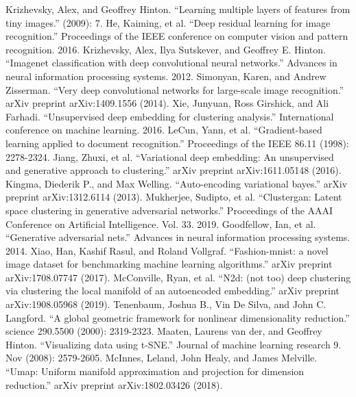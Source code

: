 \documentclass[conference]{IEEEtran}
\begin{document}
\begin{thebibliography}{00}
 Krizhevsky, Alex, and Geoffrey Hinton. ``Learning multiple layers of features from tiny images.'' (2009): 7.
 He, Kaiming, et al. ``Deep residual learning for image recognition.'' Proceedings of the IEEE conference on computer vision and pattern recognition. 2016.
 Krizhevsky, Alex, Ilya Sutskever, and Geoffrey E. Hinton. ``Imagenet classification with deep convolutional neural networks.'' Advances in neural information processing systems. 2012.
 Simonyan, Karen, and Andrew Zisserman. ``Very deep convolutional networks for large-scale image recognition.'' arXiv preprint arXiv:1409.1556 (2014).
 Xie, Junyuan, Ross Girshick, and Ali Farhadi. ``Unsupervised deep embedding for clustering analysis.'' International conference on machine learning. 2016.
 LeCun, Yann, et al. ``Gradient-based learning applied to document recognition.'' Proceedings of the IEEE 86.11 (1998): 2278-2324.
 Jiang, Zhuxi, et al. ``Variational deep embedding: An unsupervised and generative approach to clustering.'' arXiv preprint arXiv:1611.05148 (2016).
 Kingma, Diederik P., and Max Welling. ``Auto-encoding variational bayes.'' arXiv preprint arXiv:1312.6114 (2013).
 Mukherjee, Sudipto, et al. ``Clustergan: Latent space clustering in generative adversarial networks.'' Proceedings of the AAAI Conference on Artificial Intelligence. Vol. 33. 2019.
 Goodfellow, Ian, et al. ``Generative adversarial nets.'' Advances in neural information processing systems. 2014.
 Xiao, Han, Kashif Rasul, and Roland Vollgraf. ``Fashion-mnist: a novel image dataset for benchmarking machine learning algorithms.'' arXiv preprint arXiv:1708.07747 (2017).
 McConville, Ryan, et al. ``N2d: (not too) deep clustering via clustering the local manifold of an autoencoded embedding.'' arXiv preprint arXiv:1908.05968 (2019).
 Tenenbaum, Joshua B., Vin De Silva, and John C. Langford. ``A global geometric framework for nonlinear dimensionality reduction.'' science 290.5500 (2000): 2319-2323.
 Maaten, Laurens van der, and Geoffrey Hinton. ``Visualizing data using t-SNE.'' Journal of machine learning research 9. Nov (2008): 2579-2605.
 McInnes, Leland, John Healy, and James Melville. ``Umap: Uniform manifold approximation and projection for dimension reduction.'' arXiv preprint arXiv:1802.03426 (2018).

\end{thebibliography}
\end{document}
